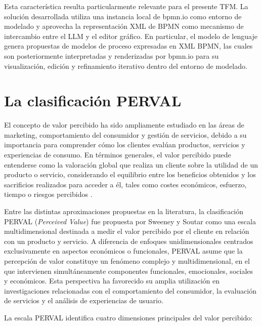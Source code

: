 Esta característica resulta particularmente relevante para el presente TFM. La solución desarrollada utiliza una instancia local de bpmn.io como entorno de modelado y aprovecha la representación XML de BPMN como mecanismo de intercambio entre el LLM y el editor gráfico. En particular, el modelo de lenguaje genera propuestas de modelos de proceso expresadas en XML BPMN, las cuales son posteriormente interpretadas y renderizadas por bpmn.io para su visualización, edición y refinamiento iterativo dentro del entorno de modelado.

\section{La clasificación PERVAL}

El concepto de valor percibido ha sido ampliamente estudiado en las áreas de marketing, comportamiento del consumidor y gestión de servicios, debido a su importancia para comprender cómo los clientes evalúan productos, servicios y experiencias de consumo. En términos generales, el valor percibido puede entenderse como la valoración global que realiza un cliente sobre la utilidad de un producto o servicio, considerando el equilibrio entre los beneficios obtenidos y los sacrificios realizados para acceder a él, tales como costes económicos, esfuerzo, tiempo o riesgos percibidos \cite{zeithaml1988}.

Entre las distintas aproximaciones propuestas en la literatura, la clasificación PERVAL (\textit{Perceived Value}) fue propuesta por Sweeney y Soutar \cite{sweeney2001perval} como una escala multidimensional  destinada a medir el valor percibido por el cliente en relación con un producto y servicio. A diferencia de enfoques unidimensionales centrados exclusivamente en aspectos económicos o funcionales, PERVAL asume que la percepción de valor constituye un fenómeno complejo y multidimensional, en el que intervienen simultáneamente componentes funcionales, emocionales, sociales y económicos. Esta perspectiva ha favorecido su amplia utilización en investigaciones relacionadas con el comportamiento del consumidor, la evaluación de servicios y el análisis de experiencias de usuario.

La escala PERVAL identifica cuatro dimensiones principales del valor percibido:

